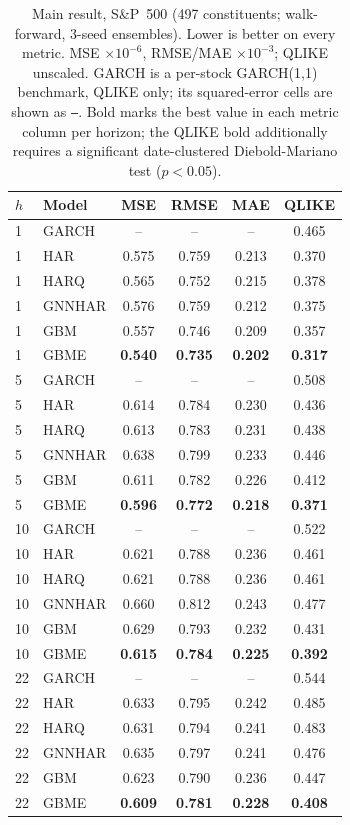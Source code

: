 \documentclass{llncs}
\begin{document}
\begin{table}[t]
\centering
\caption{Main result, S\&P~500 (497 constituents; walk-forward, 3-seed ensembles). Lower is better
on every metric. MSE $\times10^{-6}$, RMSE/MAE $\times10^{-3}$; QLIKE unscaled. GARCH is a per-stock
GARCH(1,1) benchmark, QLIKE only; its squared-error cells are shown as \texttt{--}. Bold marks the best
value in each metric column per horizon; the QLIKE bold additionally requires a significant
date-clustered Diebold-Mariano test ($p<0.05$).}
\label{tab:sp500}
\footnotesize
\setlength{\tabcolsep}{6pt}
\begin{tabular}{llcccc}
\toprule
$h$ & Model & MSE & RMSE & MAE & QLIKE \\
\midrule
1 & GARCH       & -- & -- & -- & 0.465 \\
1 & HAR         & 0.575 & 0.759 & 0.213 & 0.370 \\
1 & HARQ        & 0.565 & 0.752 & 0.215 & 0.378 \\
1 & GNNHAR      & 0.576 & 0.759 & 0.212 & 0.375 \\
1 & GBM         & 0.557 & 0.746 & 0.209 & 0.357 \\
1 & GBME        & \textbf{0.540} & \textbf{0.735} & \textbf{0.202} & \textbf{0.317} \\
\midrule
5 & GARCH       & -- & -- & -- & 0.508 \\
5 & HAR         & 0.614 & 0.784 & 0.230 & 0.436 \\
5 & HARQ        & 0.613 & 0.783 & 0.231 & 0.438 \\
5 & GNNHAR      & 0.638 & 0.799 & 0.233 & 0.446 \\
5 & GBM         & 0.611 & 0.782 & 0.226 & 0.412 \\
5 & GBME        & \textbf{0.596} & \textbf{0.772} & \textbf{0.218} & \textbf{0.371} \\
\midrule
10 & GARCH       & -- & -- & -- & 0.522 \\
10 & HAR         & 0.621 & 0.788 & 0.236 & 0.461 \\
10 & HARQ        & 0.621 & 0.788 & 0.236 & 0.461 \\
10 & GNNHAR      & 0.660 & 0.812 & 0.243 & 0.477 \\
10 & GBM         & 0.629 & 0.793 & 0.232 & 0.431 \\
10 & GBME        & \textbf{0.615} & \textbf{0.784} & \textbf{0.225} & \textbf{0.392} \\
\midrule
22 & GARCH       & -- & -- & -- & 0.544 \\
22 & HAR         & 0.633 & 0.795 & 0.242 & 0.485 \\
22 & HARQ        & 0.631 & 0.794 & 0.241 & 0.483 \\
22 & GNNHAR      & 0.635 & 0.797 & 0.241 & 0.476 \\
22 & GBM         & 0.623 & 0.790 & 0.236 & 0.447 \\
22 & GBME        & \textbf{0.609} & \textbf{0.781} & \textbf{0.228} & \textbf{0.408} \\
\bottomrule
\end{tabular}
\end{table}
\end{document}
